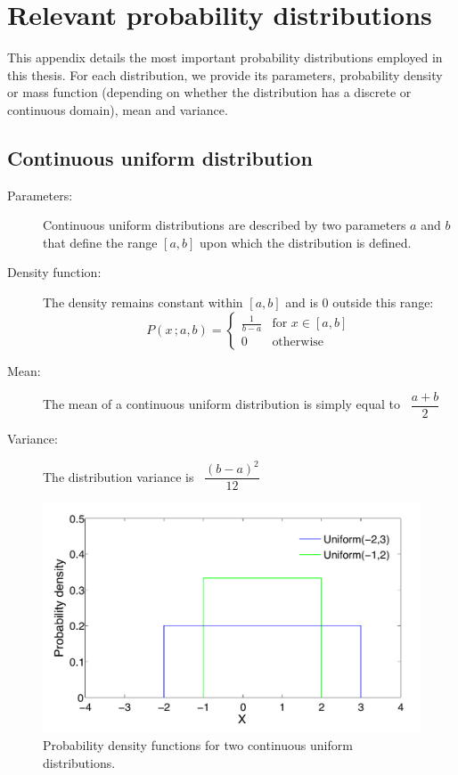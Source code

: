 \chapter{Relevant probability distributions}
\label{chap:probdistributions}

This appendix details the most important probability distributions employed in this thesis.  For each distribution, we provide its parameters, probability density or mass function (depending on whether the distribution has a discrete or continuous domain), mean and variance. 

\section*{Continuous uniform distribution}

\begin{description}
\item [Parameters: ] Continuous uniform distributions are described by two parameters $a$ and $b$ that define the range $[a,b]$ upon which the distribution is defined. 

\item [Density function: ] The density remains constant within $[a,b]$ and is $0$ outside this range:
\begin{equation}
P(x\,; a, b) = \begin{cases}
\frac{1}{b - a} & \text{for } x \in [a,b]  \\
0               & \text{otherwise}
\end{cases}
\end{equation} 
\item [Mean: ] The mean of a continuous uniform distribution is simply equal to \ $\dfrac{a+b}{2}$

\item [Variance: ] The distribution variance is \ $\dfrac{(b-a)^2}{12}$
\end{description}

\begin{figure}[h]
\centering
\includegraphics[scale=0.40]{imgs/uniform-appendix.pdf}
\caption{Probability density functions for two continuous uniform distributions.} 
\label{fig:uniform-appendix}
\end{figure}

